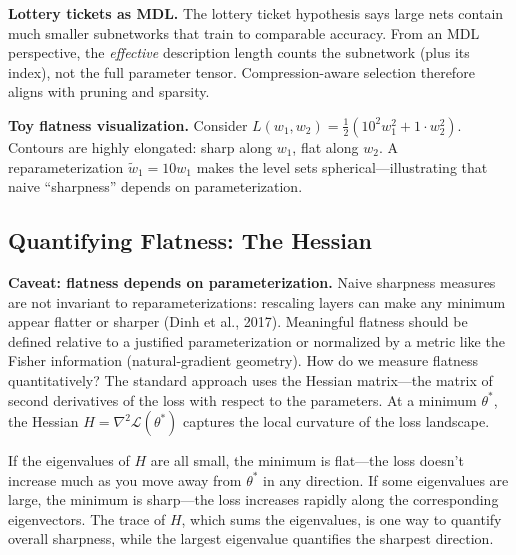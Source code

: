 \vspace{1em}



\begin{keyinsight}
\textbf{Lottery tickets as MDL.} The lottery ticket hypothesis says large nets contain much smaller subnetworks that train to comparable accuracy.
From an MDL perspective, the \emph{effective} description length counts the subnetwork (plus its index), not the full parameter tensor.
Compression-aware selection therefore aligns with pruning and sparsity.
\end{keyinsight}

\vspace{1.2em}
\vspace{1.5em}
\begin{examplebox}
\textbf{Toy flatness visualization.} Consider $L(w_1,w_2)=\tfrac{1}{2}(10^2 w_1^2 + 1\cdot w_2^2)$. Contours are highly elongated: sharp along $w_1$, flat along $w_2$. A reparameterization $\tilde w_1 = 10 w_1$ makes the level sets spherical---illustrating that naive ``sharpness'' depends on parameterization.
\end{examplebox}
\subsection{Quantifying Flatness: The Hessian}


\vspace{0.3cm}
\textbf{Caveat: flatness depends on parameterization.} Naive sharpness measures are not invariant to reparameterizations: rescaling layers can make any minimum appear flatter or sharper (Dinh et al., 2017). Meaningful flatness should be defined relative to a justified parameterization or normalized by a metric like the Fisher information (natural-gradient geometry).
How do we measure flatness quantitatively? The standard approach uses the Hessian matrix---the matrix of second derivatives of the loss with respect to the parameters. At a minimum $\theta^*$, the Hessian $H = \nabla^2 \mathcal{L}(\theta^*)$ captures the local curvature of the loss landscape.

\vspace{0.3cm}

If the eigenvalues of $H$ are all small, the minimum is flat---the loss doesn't increase much as you move away from $\theta^*$ in any direction. If some eigenvalues are large, the minimum is sharp---the loss increases rapidly along the corresponding eigenvectors. The trace of $H$, which sums the eigenvalues, is one way to quantify overall sharpness, while the largest eigenvalue quantifies the sharpest direction.

